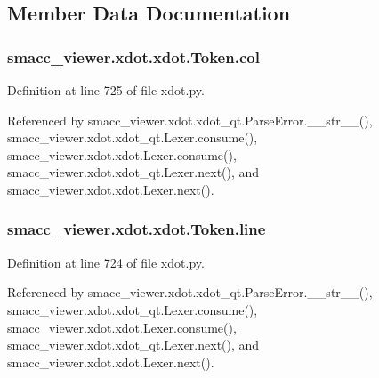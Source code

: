 \subsection{Member Data Documentation}
\subsubsection[{\texorpdfstring{col}{col}}]{\setlength{\rightskip}{0pt plus 5cm}smacc\+\_\+viewer.\+xdot.\+xdot.\+Token.\+col}\hypertarget{classsmacc__viewer_1_1xdot_1_1xdot_1_1Token_a4f3e968f9e24a9572198978f7fa32468}{}\label{classsmacc__viewer_1_1xdot_1_1xdot_1_1Token_a4f3e968f9e24a9572198978f7fa32468}


Definition at line 725 of file xdot.\+py.



Referenced by smacc\+\_\+viewer.\+xdot.\+xdot\+\_\+qt.\+Parse\+Error.\+\_\+\+\_\+str\+\_\+\+\_\+(), smacc\+\_\+viewer.\+xdot.\+xdot\+\_\+qt.\+Lexer.\+consume(), smacc\+\_\+viewer.\+xdot.\+xdot.\+Lexer.\+consume(), smacc\+\_\+viewer.\+xdot.\+xdot\+\_\+qt.\+Lexer.\+next(), and smacc\+\_\+viewer.\+xdot.\+xdot.\+Lexer.\+next().

\subsubsection[{\texorpdfstring{line}{line}}]{\setlength{\rightskip}{0pt plus 5cm}smacc\+\_\+viewer.\+xdot.\+xdot.\+Token.\+line}\hypertarget{classsmacc__viewer_1_1xdot_1_1xdot_1_1Token_aa3b452b853aedc19738ba2d96a8aec36}{}\label{classsmacc__viewer_1_1xdot_1_1xdot_1_1Token_aa3b452b853aedc19738ba2d96a8aec36}


Definition at line 724 of file xdot.\+py.



Referenced by smacc\+\_\+viewer.\+xdot.\+xdot\+\_\+qt.\+Parse\+Error.\+\_\+\+\_\+str\+\_\+\+\_\+(), smacc\+\_\+viewer.\+xdot.\+xdot\+\_\+qt.\+Lexer.\+consume(), smacc\+\_\+viewer.\+xdot.\+xdot.\+Lexer.\+consume(), smacc\+\_\+viewer.\+xdot.\+xdot\+\_\+qt.\+Lexer.\+next(), and smacc\+\_\+viewer.\+xdot.\+xdot.\+Lexer.\+next().

